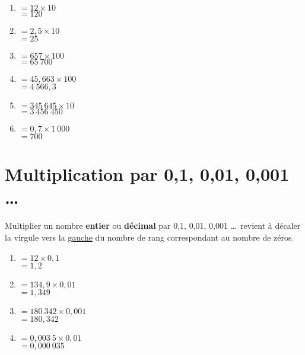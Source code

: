 \documentclass[11pt]{article}
\begin{document}
\begin{exemple}
\phantom{} \vspace{-1cm}
\begin{multicols}{2}
\begin{enumerate}[label=\Alph*]
\item $= 12 \times 10 $ \\ $ =120$
\item $= 2,5 \times 10 $ \\ $ =25$
\item $= 657 \times 100 $ \\ $ =65~700$
\item $= 45,663 \times 100 $ \\ $ =4~566,3$
\item $= 345~645 \times 10 $ \\ $ =3~456~450$
\item $= 0,7 \times 1~000 $ \\ $ =700$
\end{enumerate}
\end{multicols}
\end{exemple}

\section{Multiplication par 0,1, 0,01, 0,001 \ldots}

\begin{propriete}
Multiplier un nombre \textbf{entier} ou \textbf{décimal} par 0,1,
0,01, 0,001 \ldots ~revient à décaler la virgule vers la
\underline{gauche} du nombre de rang correspondant au nombre de zéros.
\end{propriete}

\begin{exemple}
\phantom{} \vspace{-1cm}
\begin{multicols}{2}
\begin{enumerate}[label=\Alph*]
\item $= 12 \times 0,1 $ \\ $ =1,2$
\item $= 134,9 \times 0,01 $ \\ $ =1,349$
\item $= 180~342 \times 0,001 $ \\ $ =180,342$
\item $= 0,003~5 \times 0,01 $ \\ $ =0,000~035$
\end{enumerate}
\end{multicols}
\end{exemple}
\end{document}
